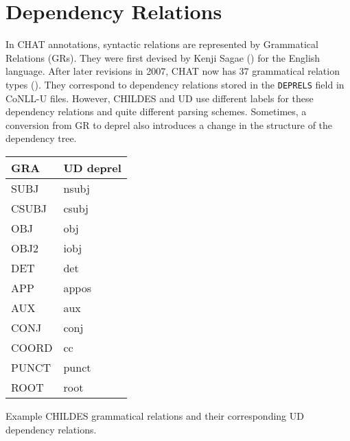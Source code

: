 

\section{Dependency Relations}
\label{sec:deprel}

In CHAT annotations, syntactic relations are represented by Grammatical Relations (GRs). They were first devised by Kenji Sagae (\cite{sagae-etal-2004-adding}) for the English language. After later revisions in 2007, CHAT now has 37 grammatical relation types (\cite{sagae2007}). They correspond to dependency relations stored in the \texttt{DEPRELS} field in CoNLL-U files. However, CHILDES and UD use different labels for these dependency relations and quite different parsing schemes. Sometimes, a conversion from GR to deprel also introduces a change in the structure of the dependency tree.

\begin{margintable}[1\baselineskip]
\begin{tabularx}{1\textwidth}{@{}Ll@{}}
\toprule
\textbf{GRA} & \textbf{UD deprel}\\ \midrule
SUBJ & nsubj\\
CSUBJ & csubj\\
OBJ & obj\\
OBJ2 & iobj\\
DET & det\\
APP & appos\\
AUX & aux\\
CONJ & conj\\
COORD & cc\\
PUNCT & punct\\
ROOT & root\\\bottomrule
\end{tabularx}
\caption{\label{tab:martabgr}Example CHILDES grammatical relations and their corresponding UD dependency relations.}
\footnotesize
\end{margintable}

